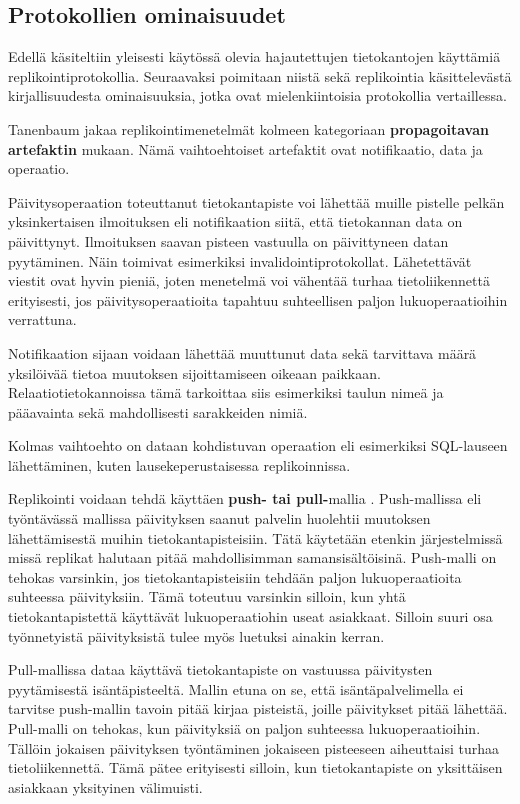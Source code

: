\documentclass[finnish,twoside,censored,csm,sw-track-2018]{HYthesisML}
\begin{document}
\subsection{Protokollien ominaisuudet}

Edellä käsiteltiin yleisesti käytössä olevia hajautettujen tietokantojen käyttämiä replikointiprotokollia. Seuraavaksi poimitaan niistä sekä replikointia käsittelevästä kirjallisuudesta ominaisuuksia, jotka ovat mielenkiintoisia protokollia vertaillessa.

Tanenbaum jakaa \citep{Tanenbaum} replikointimenetelmät kolmeen kategoriaan \textbf{propagoitavan artefaktin} mukaan. Nämä vaihtoehtoiset artefaktit ovat notifikaatio, data ja operaatio. 

Päivitysoperaation toteuttanut tietokantapiste voi lähettää muille pistelle pelkän yksinkertaisen ilmoituksen eli notifikaation siitä, että tietokannan data on päivittynyt. Ilmoituksen saavan pisteen vastuulla on päivittyneen datan pyytäminen. Näin toimivat esimerkiksi invalidointiprotokollat. Lähetettävät viestit ovat hyvin pieniä, joten menetelmä voi vähentää turhaa tietoliikennettä erityisesti, jos päivitysoperaatioita tapahtuu suhteellisen paljon lukuoperaatioihin verrattuna.
    
Notifikaation sijaan voidaan lähettää muuttunut data sekä tarvittava määrä yksilöivää tietoa muutoksen sijoittamiseen oikeaan paikkaan. Relaatiotietokannoissa tämä tarkoittaa siis esimerkiksi taulun nimeä ja pääavainta sekä mahdollisesti sarakkeiden nimiä. 

Kolmas vaihtoehto on dataan kohdistuvan operaation eli esimerkiksi SQL-lauseen lähettäminen, kuten lausekeperustaisessa replikoinnissa.

Replikointi voidaan tehdä käyttäen \textbf{push- tai pull-}mallia \citep{Tanenbaum}. Push-mallissa eli työntävässä mallissa päivityksen saanut palvelin huolehtii muutoksen lähettämisestä muihin tietokantapisteisiin. Tätä käytetään etenkin järjestelmissä missä replikat halutaan pitää mahdollisimman samansisältöisinä. Push-malli on tehokas varsinkin, jos tietokantapisteisiin tehdään paljon lukuoperaatioita suhteessa päivityksiin. Tämä toteutuu varsinkin silloin, kun yhtä tietokantapistettä käyttävät lukuoperaatiohin useat asiakkaat. Silloin suuri osa työnnetyistä päivityksistä tulee myös luetuksi ainakin kerran.

Pull-mallissa dataa käyttävä tietokantapiste on vastuussa päivitysten pyytämisestä isäntäpisteeltä. Mallin etuna on se, että isäntäpalvelimella ei tarvitse push-mallin tavoin pitää kirjaa pisteistä, joille päivitykset pitää lähettää. Pull-malli on tehokas, kun päivityksiä on paljon suhteessa lukuoperaatioihin. Tällöin jokaisen päivityksen työntäminen jokaiseen pisteeseen aiheuttaisi turhaa tietoliikennettä. Tämä pätee erityisesti silloin, kun tietokantapiste on yksittäisen asiakkaan yksityinen välimuisti.
\end{document}
